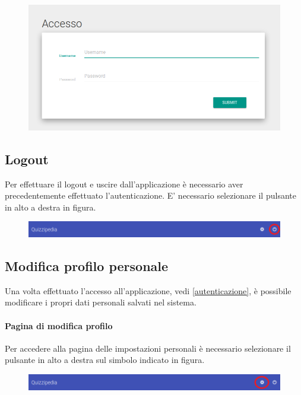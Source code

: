 \documentclass[12pt,a4paper]{article}
\begin{document}
		\begin{figure}[h]
		
		\centering
		\includegraphics[width=0.8\linewidth]{../img/screenshot/login_crop.png}
		\caption{}
		\label{Schermata di autenticazione}
		\end{figure}
		
		
	\subsection{Logout}
	Per effettuare il logout e uscire dall'applicazione è necessario aver precedentemente effettuato l'autenticazione.
	E' necessario selezionare il pulsante in alto a destra in figura.
	\begin{figure}[h]	
		\centering
		\includegraphics[width=1.0\linewidth]{../img/screenshot/barra_logout.png}
		\caption{}
		\label{Pulsante di logout}
	\end{figure}

	\subsection{Modifica profilo personale}
	Una volta effettuato l'accesso all'applicazione, vedi \ref{autenticazione}, è possibile modificare i propri dati personali salvati nel sistema.
    
	\paragraph{Pagina di modifica profilo}
	Per accedere alla pagina delle impostazioni personali è necessario selezionare il pulsante in alto a destra sul simbolo indicato in figura.
	
	\begin{figure}[h]
		\centering
		\includegraphics[width=1.0\linewidth]{../img/screenshot/barra_impostaz.png}
		\caption{}
		\label{Pulsante di logout}
	\end{figure}
	
\end{document}
